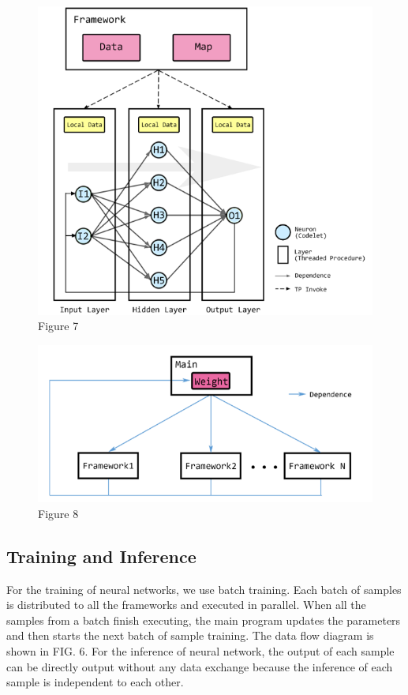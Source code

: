 \begin{figure}[h]
\caption{Figure 7}
\centering
\includegraphics[width=1\textwidth]{Fig/figure7.png}
\end{figure}
 
\begin{figure}[h]
\caption{Figure 8}
\centering
\includegraphics[width=1\textwidth]{Fig/figure8.png}
\end{figure}

\subsection{Training and Inference}
For the training of neural networks, we use batch training. Each batch of samples is distributed to all the frameworks and executed in parallel. When all the samples from a batch finish executing, the main program updates the parameters and then starts the next batch of sample training. The data flow diagram is shown in FIG. 6. For the inference of neural network, the output of each sample can be directly output without any data exchange because the inference of each sample is independent to each other.
